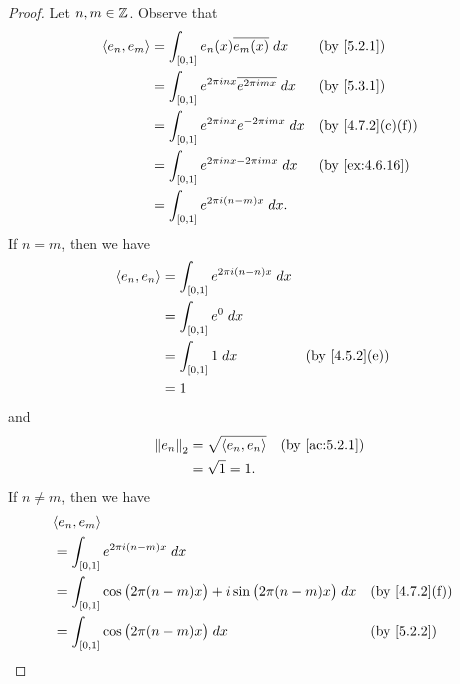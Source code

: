 \begin{proof}
  Let \(n, m \in \mathbb{Z}\).
  Observe that
  \begin{align*}
    \inner*{e_n, e_m} & = \int_{[0, 1]} e_n(x) \overline{e_m(x)} \; dx                   &  & \text{(by \cref{5.2.1})}       \\
                      & = \int_{[0, 1]} e^{2 \pi i n x} \overline{e^{2 \pi i m x}} \; dx &  & \text{(by \cref{5.3.1})}       \\
                      & = \int_{[0, 1]} e^{2 \pi i n x} e^{- 2 \pi i m x} \; dx          &  & \text{(by \cref{4.7.2}(c)(f))} \\
                      & = \int_{[0, 1]} e^{2 \pi i n x - 2 \pi i m x} \; dx              &  & \text{(by \cref{ex:4.6.16})}   \\
                      & = \int_{[0, 1]} e^{2 \pi i (n - m) x} \; dx.
  \end{align*}
  If \(n = m\), then we have
  \begin{align*}
    \inner*{e_n, e_n} & = \int_{[0, 1]} e^{2 \pi i (n - n) x} \; dx                                  \\
                      & = \int_{[0, 1]} e^0 \; dx                                                    \\
                      & = \int_{[0, 1]} 1 \; dx                     &  & \text{(by \cref{4.5.2}(e))} \\
                      & = 1
  \end{align*}
  and
  \begin{align*}
    \norm*{e_n}_2 & = \sqrt{\inner*{e_n, e_n}} &  & \text{(by \cref{ac:5.2.1})} \\
                  & = \sqrt{1} = 1.
  \end{align*}
  If \(n \neq m\), then we have
  \begin{align*}
     & \inner*{e_n, e_m}                                                                                                                \\
     & = \int_{[0, 1]} e^{2 \pi i (n - m) x} \; dx                                                                                      \\
     & = \int_{[0, 1]} \cos\big(2 \pi (n - m) x\big) + i \sin\big(2 \pi (n - m) x\big) \; dx        &  & \text{(by \cref{4.7.2}(f))}    \\
     & = \int_{[0, 1]} \cos\big(2 \pi (n - m) x\big) \; dx                                          &  & \text{(by \cref{5.2.2})}       \\

\end{align*}
\end{proof}
